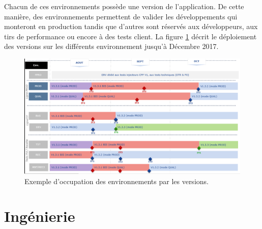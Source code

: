 \documentclass[12pt,a4paper]{article}
\begin{document}
\medbreak
Chacun de ces environnements possède une version de l'application. De cette manière, des environnements permettent de valider les développements qui monteront en production tandis que d'autres sont réservés aux développeurs, aux tirs de performance ou encore à des tests client. La figure \ref{environnement} décrit le déploiement des versions sur les différents environnement jusqu'à Décembre 2017.
\begin{figure}[H]
	\begin{center}
		\includegraphics[width=1.1\textwidth,keepaspectratio]{environnements.png}
		\caption{Exemple d'occupation des environnements par les versions.}
		\label{environnement}
	\end{center}
\end{figure}
\medbreak
\clearpage
\newpage
\section{Ingénierie}
\end{document}
